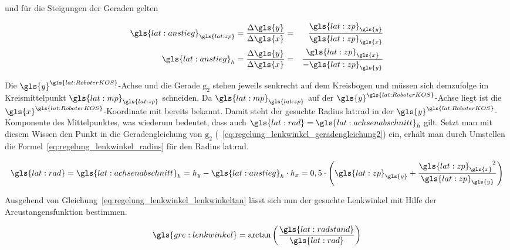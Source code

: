 und für die Steigungen der Geraden gelten

\begin{eqnarray}
 {\gls{lat:anstieg}}_{\gls{lat:zp}} = \frac{\Delta \gls{y}}{\Delta \gls{x}} & = & \frac{{\gls{lat:zp}}_{\gls{y}}}{{\gls{lat:zp}}_{\gls{x}}} 	\\
 {\gls{lat:anstieg}}_h = \frac{\Delta \gls{y}}{\Delta \gls{x}} & = & \frac{{\gls{lat:zp}}_{\gls{x}}}{-{\gls{lat:zp}}_{\gls{y}}}
\end{eqnarray}

Die \( {\gls{y}}^{\gls{lat:RoboterKOS}} \)-Achse und die Gerade \( \mathrm{g_2} \) stehen jeweils senkrecht auf dem Kreisbogen und müssen sich demzufolge im Kreismittelpunkt \( {\gls{lat:mp}}_{\gls{lat:zp}} \) schneiden. Da \( {\gls{lat:mp}}_{\gls{lat:zp}} \) auf der \( {\gls{y}}^{\gls{lat:RoboterKOS}} \)-Achse liegt ist die \( {\gls{x}}^{\gls{lat:RoboterKOS}} \)-Koordinate mit \grqq{} bereits bekannt. Damit steht der gesuchte Radius \gls{lat:rad} in der \( {\gls{y}}^{\gls{lat:RoboterKOS}} \)-Komponente des Mittelpunktes, was wiederum bedeutet, dass auch \( \gls{lat:rad} = {\gls{lat:achsenabschnitt}}_h \) gilt. Setzt man mit diesem Wissen den Punkt  in die Geradengleichung von \( \mathrm{g_2} \) (~\ref{eq:regelung_lenkwinkel_geradengleichung2}) ein, erhält man durch Umstellen die Formel~\ref{eq:regelung_lenkwinkel_radius} für den Radius \gls{lat:rad}.

\begin{equation}
\gls{lat:rad} = {\gls{lat:achsenabschnitt}}_h = h_y - {\gls{lat:anstieg}}_h \cdot h_x = 0,5 \cdot \left( {\gls{lat:zp}}_{\gls{y}} + \frac{{{\gls{lat:zp}}_{\gls{x}}}^2}{{\gls{lat:zp}}_{\gls{y}}} \right)
\label{eq:regelung_lenkwinkel_radius}
\end{equation}

Ausgehend von Gleichung~\ref{eq:regelung_lenkwinkel_lenkwinkeltan} lässt sich nun der gesuchte Lenkwinkel mit Hilfe der Arcustangensfunktion bestimmen.

\begin{equation}
\gls{gre:lenkwinkel} = \arctan \left( \frac{\gls{lat:radstand}}{\gls{lat:rad}} \right)
\end{equation}
